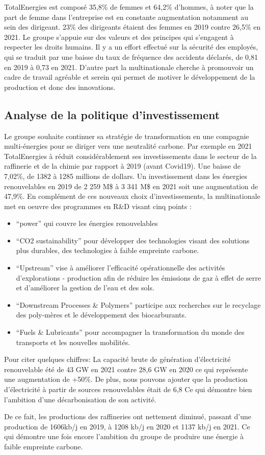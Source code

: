\documentclass[12pt]{article}
\begin{document}
TotalEnergies est composé 35,8\% de femmes et 64,2\% d'hommes, à noter que la part de femme dans l'entreprise 
est en constante augmentation notamment au sein des dirigeant. 23\% des dirigeants étaient des femmes en 2019 
contre 26,5\% en 2021. Le groupe s'appuie sur des valeurs et des principes qui s'engagent à respecter les droits humains. Il y a un effort effectué sur la sécurité des employés, qui se traduit par une 
baisse du taux de fréquence des accidents déclarés, de 0,81 en 2019 à 0,73 en 2021.
D'autre part la multinationale cherche à promouvoir un cadre de travail agréable et serein qui permet de 
motiver le développement de la production et donc des innovations. 

\subsection{Analyse de la politique d'investissement} 
Le groupe souhaite continuer sa stratégie de transformation en une compagnie multi-énergies pour se diriger 
vers une neutralité carbone. Par exemple en 2021 TotalEnergies à réduit considérablement ses investissements 
dans le secteur de la raffinerie et de la chimie par rapport à 2019 (avant Covid19). Une baisse 
de 7,02\%, de 1382 à 1285 millions de dollars.
Un investissement dans les énergies renouvelables en 2019 de 2 259 M\$ à 3 341 M\$ en 2021 soit une augmentation de 47,9\%.
En complément de ces nouveaux choix d'investissements, la multinationale met en oeuvre des programmes en R\&D visant cinq points : 
\begin{itemize}
    \item “power” qui couvre les énergies renouvelables 
    \item “CO2 sustainability” pour développer des technologies visant des solutions plus durables, des  
        technologies à faible empreinte carbone.
    \item “Upstream” vise à améliorer l'efficacité opérationnelle des activités d'explorations - production afin 
        de réduire les émissions de gaz à effet de serre et d'améliorer la gestion de l'eau et des sols.
    \item “Downstream Processes \& Polymers” participe aux recherches sur le recyclage des poly-mères et le   
        développement des biocarburants.
    \item “Fuels \& Lubricants” pour accompagner la transformation du monde des transports et les nouvelles 
        mobilités.
\end{itemize}
Pour citer quelques chiffres: 
La capacité brute de génération d'électricité renouvelable été de 43 GW en 2021 contre 28,6 GW en 2020 ce qui représente une augmentation de +50\%. De plus, nous pouvons ajouter que la production d'électricité à partir de sources renouvelables était de 6,8%
Ce qui démontre bien l'ambition d'une décarbonisation de son activité.

De ce fait, les productions des raffineries ont nettement diminué, passant d'une production de 1606kb/j en 2019, à 1208 kb/j en 2020 et 1137 kb/j en 2021. Ce qui démontre une fois encore l'ambition du groupe de produire une énergie à faible empreinte carbone.
\end{document}
